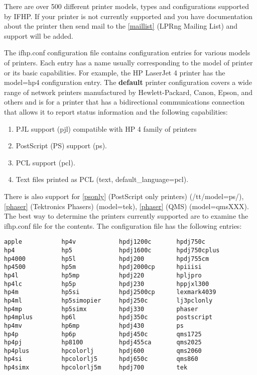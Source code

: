 \documentclass[a4paper]{article}
\begin{document}
There are over 500 different printer models,
types and configurations supported by IFHP.
If your printer is not currently supported
and you have documentation about the printer then send mail to the
\ref{maillist} {(LPRng Mailing List)}
and support will be added.

The {\ttfamily ifhp.conf} configuration file contains
configuration entries for various models of printers.
Each entry has a name usually corresponding to the model of printer
or its basic capabilities.
For example,
the HP LaserJet 4 printer has the {\ttfamily model=hp4} configuration entry.
The {\bfseries default} printer configuration
covers a wide range of network printers manufactured by Hewlett-Packard,
Canon,  Epson, and others and
is for a printer that has a bidirectional communications
connection that allows it to report status information
and the following capabilities:
\begin{enumerate}
\item  PJL support ({\ttfamily pjl}) compatible with HP 4 family of printers
\item  PostScript (PS) support ({\ttfamily ps}).
\item  PCL support ({\ttfamily pcl}).
\item  Text files printed as PCL ({\ttfamily text}, {\ttfamily default\_language=pcl}).
\end{enumerate}


There is also support for
\ref{psonly} {(PostScript only printers)} (/tt/model=ps/),
\ref{phaser} {(Tektronics Phasers)} ({\ttfamily model=tek}),
\ref{phaser} {(QMS)} ({\ttfamily model=qmsXXX}).
The best way to determine the printers currently supported are
to examine the {\ttfamily ifhp.conf} file
for the contents.
The configuration file has the following entries:
\begin{tscreen}
\begin{verbatim}
apple           hp4v            hpdj1200c       hpdj750c
hp4             hp5             hpdj1600c       hpdj750cplus
hp4000          hp5l            hpdj200         hpdj755cm
hp4500          hp5m            hpdj2000cp      hpiiisi
hp4l            hp5mp           hpdj220         hpljpro
hp4lc           hp5p            hpdj230         hppjxl300
hp4m            hp5si           hpdj2500cp      lexmark4039
hp4ml           hp5simopier     hpdj250c        lj3pclonly
hp4mp           hp5simx         hpdj330         phaser
hp4mplus        hp6l            hpdj350c        postscript
hp4mv           hp6mp           hpdj430         ps
hp4p            hp6p            hpdj450c        qms1725
hp4pj           hp8100          hpdj455ca       qms2025
hp4plus         hpcolorlj       hpdj600         qms2060
hp4si           hpcolorlj5      hpdj650c        qms860
hp4simx         hpcolorlj5m     hpdj700         tek
\end{verbatim}
\end{tscreen}
\end{document}
